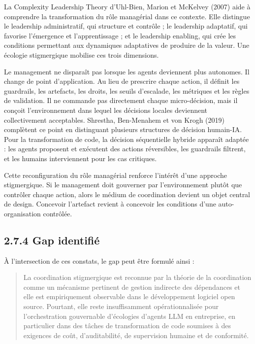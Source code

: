 La Complexity Leadership Theory d'Uhl-Bien, Marion et McKelvey (2007) aide à comprendre la transformation du rôle managérial dans ce contexte. Elle distingue le leadership administratif, qui structure et contrôle ; le leadership adaptatif, qui favorise l'émergence et l'apprentissage ; et le leadership enabling, qui crée les conditions permettant aux dynamiques adaptatives de produire de la valeur. Une écologie stigmergique mobilise ces trois dimensions.

Le management ne disparaît pas lorsque les agents deviennent plus autonomes. Il change de point d'application. Au lieu de prescrire chaque action, il définit les guardrails, les artefacts, les droits, les seuils d'escalade, les métriques et les règles de validation. Il ne commande pas directement chaque micro-décision, mais il conçoit l'environnement dans lequel les décisions locales deviennent collectivement acceptables. Shrestha, Ben-Menahem et von Krogh (2019) complètent ce point en distinguant plusieurs structures de décision humain-IA. Pour la transformation de code, la décision séquentielle hybride apparaît adaptée : les agents proposent et exécutent des actions réversibles, les guardrails filtrent, et les humains interviennent pour les cas critiques.

Cette reconfiguration du rôle managérial renforce l'intérêt d'une approche stigmergique. Si le management doit gouverner par l'environnement plutôt que contrôler chaque action, alors le médium de coordination devient un objet central de design. Concevoir l'artefact revient à concevoir les conditions d'une auto-organisation contrôlée.

\subsection{2.7.4 Gap identifié}\label{gap-identifiuxe9}

À l'intersection de ces constats, le gap peut être formulé ainsi :

\begin{quote}
La coordination stigmergique est reconnue par la théorie de la coordination comme un mécanisme pertinent de gestion indirecte des dépendances et elle est empiriquement observable dans le développement logiciel open source. Pourtant, elle reste insuffisamment opérationnalisée pour l'orchestration gouvernable d'écologies d'agents LLM en entreprise, en particulier dans des tâches de transformation de code soumises à des exigences de coût, d'auditabilité, de supervision humaine et de conformité.
\end{quote}


